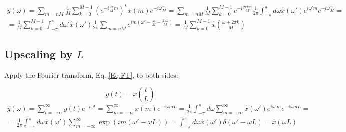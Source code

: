 \documentclass[twoside]{amsart}
\theoremstyle{plain}
\theoremstyle{definition}
\theoremstyle{remark}
\numberwithin{equation}{section}
\begin{document}
\begin{equation}\label{Eq:Downderiv}
\begin{gathered}
  \widehat{y}(\omega) = \sum_{m=nM} \frac{1}{M} \sum_{k=0}^{M-1} ( e^{-i \frac{2\pi}{M} m })^k x(m) e^{-i\omega \frac{m}{M}} = \sum_{m=nM} \frac{1}{M} \sum_{k=0}^{M-1} e^{ -i \frac{2\pi k m}{M} } \frac{1}{2\pi } \int_{-\pi}^{\pi} d\omega \widehat{x}(\omega') e^{i \omega' m} e^{-i \omega \frac{m}{M}} = \\
  = \frac{1}{M} \sum_{k=0}^{M-1} \int_{-\pi}^{\pi} d\omega' \widehat{x}(\omega') \frac{1}{2\pi} \sum_{m=nM} e^{i m (\omega' - \frac{\omega}{M} - \frac{2\pi k}{M}  )} = \boxed{ \frac{1}{M} \sum_{k=0}^{M-1} \widehat{x}(\frac{\omega + 2\pi k}{M} ) }
\end{gathered}
\end{equation}






\subsection*{Upscaling by $L$}

Apply the Fourier transform, Eq. \ref{Eq:FT}, to both sides:

\[
y(t) = x\left( \frac{t}{L} \right)
\]
\begin{equation}\label{Eq:Upderiv}
\begin{gathered}
\widehat{y}(\omega) = \sum_{t=-\infty}^{\infty} y(t) e^{-i\omega t} = \sum_{m=-\infty}^{\infty} x(m) e^{-i \omega mL} = \frac{1}{2\pi} \int_{-\pi}^{\pi} d\omega \sum_{m=-\infty}^{\infty} \widehat{x}(\omega')e^{i\omega' m} e^{-i\omega m L} = \\
= \frac{1}{2\pi } \int_{-\pi}^{\pi} d\omega \widehat{x}(\omega') \sum_{m=-\infty}^{\infty} \exp{ ( i m( \omega' - \omega L) )} = \int_{-\pi}^{\pi} d\omega \widehat{x}(\omega') \delta(\omega'-\omega L) = \widehat{x}(\omega L)
\end{gathered}
\end{equation}
\end{document}
